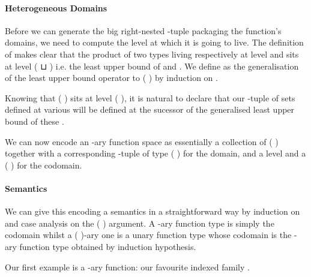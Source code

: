 
\paragraph{Heterogeneous Domains} Before we can generate the big right-nested
-tuple packaging the function's domains, we need to compute the level at
which it is going to live. The definition of  makes clear that the product
of two types living respectively at level  and  sits at level
{( ⊔ )} i.e. the least upper bound of  and .
We define  as the generalisation of the least upper bound operator
to {( )} by induction on .


Knowing that {( )} sits at level {( )}, it is
natural to declare that our -tuple of sets defined at various 
will be defined at the sucessor of the generalised least upper bound of these
.


We can now encode an -ary function space as essentially a collection 
of {( )} together with a corresponding -tuple of type
{(  )} for the domain, and a level  and a
{( )} for the codomain.

\paragraph{Semantics} We can give this encoding a semantics in a straightforward way
by induction on  and case analysis on the {(  )} argument.
A -ary function type is simply the codomain whilst a {( )}-ary
one is a unary function type whose codomain is the -ary function type obtained
by induction hypothesis.


Our first example is a -ary function: our favourite indexed family .

